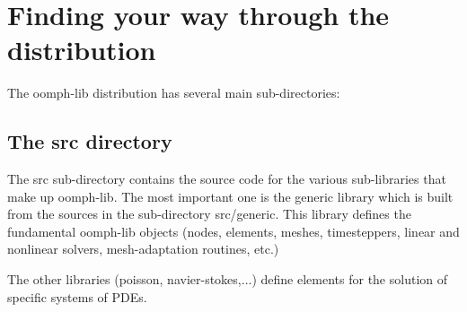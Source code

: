 \hypertarget{index_nav}{}\section{Finding your way through the distribution}\label{index_nav}
The {\ttfamily oomph-\/lib} distribution has several main sub-\/directories\+:\hypertarget{index_src}{}\subsection{The src directory}\label{index_src}
The {\ttfamily src} sub-\/directory contains the source code for the various sub-\/libraries that make up {\ttfamily oomph-\/lib}. The most important one is the {\ttfamily generic} library which is built from the sources in the sub-\/directory {\ttfamily src/generic}. This library defines the fundamental {\ttfamily oomph-\/lib} objects (nodes, elements, meshes, timesteppers, linear and nonlinear solvers, mesh-\/adaptation routines, etc.)

The other libraries ({\ttfamily poisson}, {\ttfamily navier-\/stokes},...) define elements for the solution of specific systems of P\+D\+Es.

